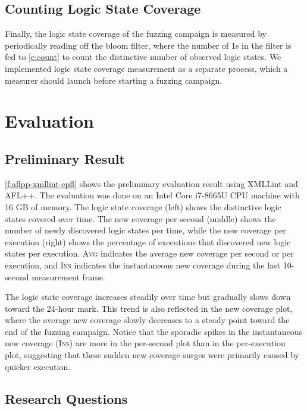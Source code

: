 \documentclass[letterpaper,twocolumn,10pt]{article}
\begin{document}
\subsection{Counting Logic State Coverage}
\label{s:design:count}

Finally, the logic state coverage of the fuzzing campaign is measured by
periodically reading off the bloom filter, where the number of 1s in the filter
is fed to \autoref{e:count} to count the distinctive number of observed logic
states. We implemented logic state coverage measurement as a separate process,
which a measurer should launch before starting a fuzzing campaign.

\section{Evaluation}

\subsection{Preliminary Result}

\autoref{f:aflpp-xmllint-epfl} shows the preliminary evaluation result
using XMLLint and AFL++. The evaluation was done on an Intel Core i7-8665U CPU
machine with 16 GB of memory. The logic state coverage (left) shows the
distinctive logic states covered over time. The new coverage per second (middle)
shows the number of newly discovered logic states per time, while the new
coverage per execution (right) shows the percentage of executions that
discovered new logic states per execution. \textsc{Avg} indicates the average
new coverage per second or per execution, and \textsc{Ins} indicates the
instantaneous new coverage during the last 10-second measurement frame.

The logic state coverage increases steadily over time but gradually slows
down toward the 24-hour mark. This trend is also reflected in the new coverage
plot, where the average new coverage slowly decreases to a steady point toward
the end of the fuzzing campaign.
%
Notice that the sporadic spikes in the instantaneous new coverage (\textsc{Ins})
are more in the per-second plot than in the per-execution plot, suggesting that
these sudden new coverage surges were primarily caused by quicker execution. 

\subsection{Research Questions}
\end{document}
